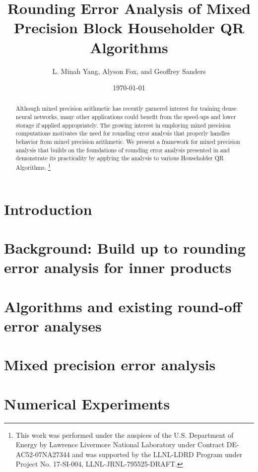\documentclass[review,onefignum,onetabnum]{siamart190516}
\title{Rounding Error Analysis of Mixed Precision Block Householder QR Algorithms}
\author{L. Minah Yang, Alyson Fox, and Geoffrey Sanders}
\date{\today}
\newcommand\blfootnote[1]{%
	\begingroup
	\renewcommand\thefootnote{}\footnote{#1}%
	\addtocounter{footnote}{-1}%
	\endgroup
}
\begin{document}
\maketitle
\begin{abstract}
	Although mixed precision arithmetic has recently garnered interest for training dense neural networks, many other applications could benefit from the  speed-ups and lower storage if applied appropriately. 
	The growing interest in employing mixed precision computations motivates the need for rounding error analysis that properly handles behavior from mixed precision arithmetic.
	We present a framework for mixed precision analysis that builds on the foundations of rounding error analysis presented in \cite{Higham2002} and demonstrate its practicality by applying the analysis to various Householder QR Algorithms. 
	\blfootnote{This work was performed under the auspices of the U.S. Department of Energy by Lawrence Livermore National Laboratory under Contract DE-AC52-07NA27344 and was supported by the LLNL-LDRD Program under Project No. 17-SI-004, LLNL-JRNL-795525-DRAFT.}
\end{abstract}
\section{Introduction}\label{sec:intro}

\section{Background: Build up to rounding error analysis for inner products}\label{sec:background}

\section{Algorithms and existing round-off error analyses}\label{sec:algo}

\section{Mixed precision error analysis}\label{sec:mpanalysis}

\section{Numerical Experiments}\label{sec:NE}


%
%
%
%
%
\end{document}
